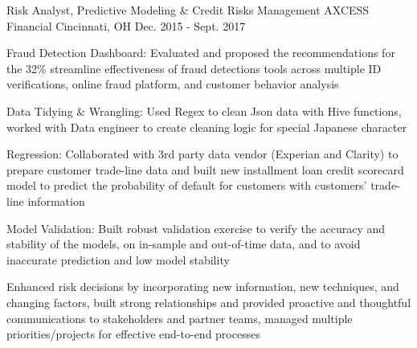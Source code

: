 \begin{cventries}
\cventry
{Risk Analyst, Predictive Modeling \& Credit Risks Management} %
{AXCESS Financial} %
{Cincinnati, OH} %
{Dec. 2015 - Sept. 2017} %
{
\begin{cvitems}
	\item{Fraud Detection Dashboard: Evaluated and proposed the recommendations for the 32\% streamline effectiveness of fraud detections tools across multiple ID verifications, online fraud platform, and customer behavior analysis}
	\item{Data Tidying \& Wrangling: Used Regex to clean Json data with Hive functions, worked with Data engineer to create cleaning logic for special Japanese character}
	\item{Regression: Collaborated with 3rd party data vendor (Experian and Clarity) to prepare customer trade-line data and built new installment loan credit scorecard model to predict the probability of default for customers with customers' trade-line information}
	\item{Model Validation: Built robust validation exercise to verify the accuracy and stability of the models, on in-sample and out-of-time data, and to avoid inaccurate prediction and low model stability}
	\item{Enhanced risk decisions by incorporating new information, new techniques, and changing factors, built strong relationships and provided proactive and thoughtful communications to stakeholders and partner teams, managed multiple priorities/projects for effective end-to-end processes}
\end{cvitems}
}



\end{cventries}